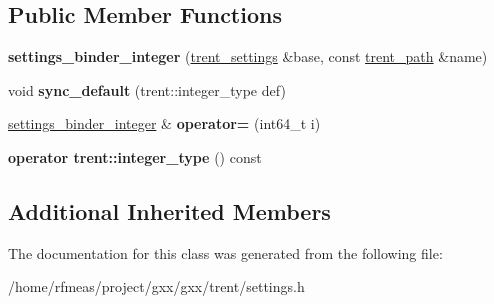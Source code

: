 \subsection*{Public Member Functions}
\begin{DoxyCompactItemize}
\item 
{\bfseries settings\+\_\+binder\+\_\+integer} (\hyperlink{structgxx_1_1trent__settings}{trent\+\_\+settings} \&base, const \hyperlink{structgxx_1_1trent__path}{trent\+\_\+path} \&name)\hypertarget{classgxx_1_1settings__binder__integer_a1997af1c5c2680869d7f647941b3b09a}{}\label{classgxx_1_1settings__binder__integer_a1997af1c5c2680869d7f647941b3b09a}

\item 
void {\bfseries sync\+\_\+default} (trent\+::integer\+\_\+type def)\hypertarget{classgxx_1_1settings__binder__integer_a6dbbba73c849fa8615d402fa9b8510f8}{}\label{classgxx_1_1settings__binder__integer_a6dbbba73c849fa8615d402fa9b8510f8}

\item 
\hyperlink{classgxx_1_1settings__binder__integer}{settings\+\_\+binder\+\_\+integer} \& {\bfseries operator=} (int64\+\_\+t i)\hypertarget{classgxx_1_1settings__binder__integer_a9afdf234199496e6ca721b222e421d95}{}\label{classgxx_1_1settings__binder__integer_a9afdf234199496e6ca721b222e421d95}

\item 
{\bfseries operator trent\+::integer\+\_\+type} () const \hypertarget{classgxx_1_1settings__binder__integer_ad85f2f8c1cdf8ee5123ffa99c697ad79}{}\label{classgxx_1_1settings__binder__integer_ad85f2f8c1cdf8ee5123ffa99c697ad79}

\end{DoxyCompactItemize}
\subsection*{Additional Inherited Members}


The documentation for this class was generated from the following file\+:\begin{DoxyCompactItemize}
\item 
/home/rfmeas/project/gxx/gxx/trent/settings.\+h\end{DoxyCompactItemize}
